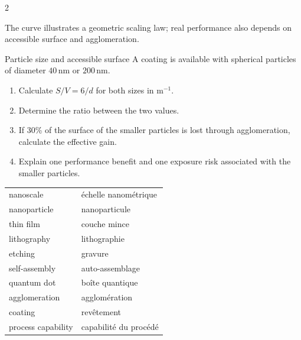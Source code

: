 \begin{multicols}{2}
\begin{tcolorbox}[title=\sffamily\bfseries Surface area increases as size decreases,colback=white,colframe=ECGreen]
\begin{center}
\end{center}
\footnotesize The curve illustrates a geometric scaling law; real performance also depends on accessible surface and agglomeration.
\end{tcolorbox}

\begin{applicationexercise}{Particle size and accessible surface}
A coating is available with spherical particles of diameter $40\,\mathrm{nm}$ or $200\,\mathrm{nm}$.
\begin{enumerate}
\item Calculate $S/V=6/d$ for both sizes in $\mathrm{m^{-1}}$.
\item Determine the ratio between the two values.
\item If 30\% of the surface of the smaller particles is lost through agglomeration, calculate the effective gain.
\item Explain one performance benefit and one exposure risk associated with the smaller particles.
\end{enumerate}
\end{applicationexercise}

\begin{vocabulary}
\begin{tabularx}{\linewidth}{@{}lX@{}}
nanoscale & échelle nanométrique\\
nanoparticle & nanoparticule\\
thin film & couche mince\\
lithography & lithographie\\
etching & gravure\\
self-assembly & auto-assemblage\\
quantum dot & boîte quantique\\
agglomeration & agglomération\\
coating & revêtement\\
process capability & capabilité du procédé
\end{tabularx}
\end{vocabulary}


\end{multicols}
